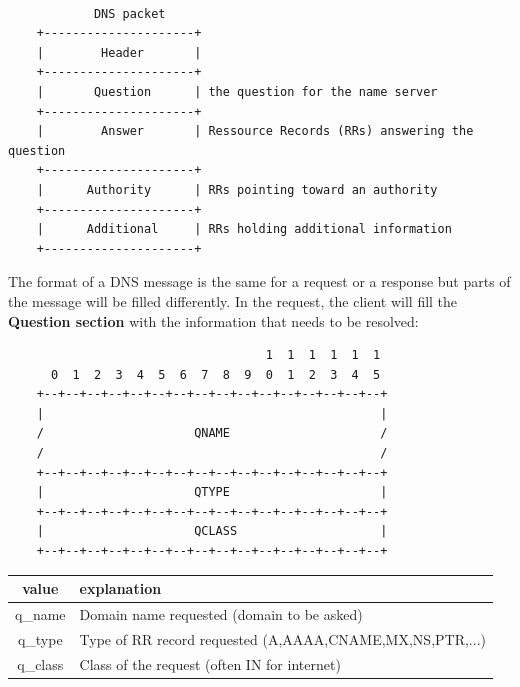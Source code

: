 \begin{verbatim}

			DNS packet
    +---------------------+
    |        Header       |
    +---------------------+
    |       Question      | the question for the name server
    +---------------------+
    |        Answer       | Ressource Records (RRs) answering the question
    +---------------------+
    |      Authority      | RRs pointing toward an authority
    +---------------------+
    |      Additional     | RRs holding additional information
    +---------------------+

\end{verbatim}
The format of a DNS message is the same for a request or a response but parts of the message will be filled differently. In the request, the client will fill the \textbf{Question section} with the information that needs to be resolved:
\begin{verbatim}
                                    1  1  1  1  1  1
      0  1  2  3  4  5  6  7  8  9  0  1  2  3  4  5
    +--+--+--+--+--+--+--+--+--+--+--+--+--+--+--+--+
    |                                               |
    /                     QNAME                     /
    /                                               /
    +--+--+--+--+--+--+--+--+--+--+--+--+--+--+--+--+
    |                     QTYPE                     |
    +--+--+--+--+--+--+--+--+--+--+--+--+--+--+--+--+
    |                     QCLASS                    |
    +--+--+--+--+--+--+--+--+--+--+--+--+--+--+--+--+
\end{verbatim}

\begin{tabular}{c|l}
value & explanation\\
\hline
q\_name  & Domain name requested (domain to be asked) \\
\hline
q\_type  & Type of RR record requested (A,AAAA,CNAME,MX,NS,PTR,...) \\
\hline
q\_class & Class of the request (often IN for internet) \\
\hline
\end{tabular}

